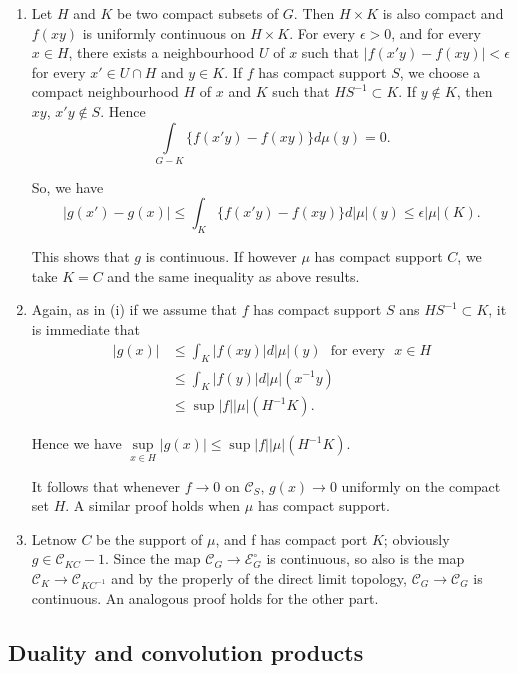 \begin{enumerate}
\renewcommand{\labelenumi}{\roman{enumi}}
\renewcommand{\labelenumi}{(\theenumi)}
\item Let  $H$ and $K$  be two compact subsets of $G$. Then $H \times
  K$ is also compact and $f(xy)$ is uniformly continuous on $H\times
  K$. For every $\epsilon >0$, and for every $x  \in H$, there exists a
  neighbourhood $U$ of $x$  such that $|f(x'y) -f (xy)| < \epsilon$ for
  every $x' \in U \cap H$ and   $y \in   K$. If $f$ has compact support
  $S$, we choose a compact neighbourhood $H$ of $x$ and $K$ such that
  $H S^{-1}\subset K$. If $y \notin K$, then $xy$, $x'y\notin S$. Hence 
$$
\int\limits_{G-K}\bigg\{f(x'y)-f(xy)\bigg\}d\mu (y)=0.
$$

So, we have
$$
|g(x') -g(x)|\leq\int_K \bigg\{f(x'y)-f(xy)\bigg\}d |\mu| (y)
\leqslant \epsilon |\mu|(K).  
$$

This shows that $g$ is continuous. If however $\mu$ has compact
support $C$, we take $K=C$ and the same inequality as above results. 

\item Again, as in (i) if we assume that  $f$ has compact support $S$
  ans $ H S^{-1}\subset K$, it is immediate that 
\begin{align*}
|g(x)| &\leq \int_K | f (xy)| d | \mu| (y) \text{~ for every~ } x \in H\\
&\leq \int_K |f(y) | d|\mu|(x^{-1}y)\\
&\leq \sup |f| |\mu| (H^{-1}K).
\end{align*}

Hence we have $\sup\limits_{x \in H} |g(x)|  \leq \sup  |f||\mu|
(H^{-1}K)$. 

It follows that whenever $f  \rightarrow 0$ on $\mathscr{C} _S$,
$g(x)\rightarrow 0$  uniformly on the compact set $H$. A similar proof
holds when $\mu $ has compact support. 

\item Let\pageoriginale now $C$ be the support of $\mu$, and f has
  compact port $K$; 
  obviously $g \in \mathscr{C}_{KC}-1$. Since the map $\mathscr{C}_G
  \rightarrow \mathscr{E}_G^\circ$ is continuous, so also is the map
  $\mathscr{C}_K \rightarrow \mathscr{C}_{KC^{-1}}$ and by the properly
  of the direct limit topology,
  $\mathscr{C}_G\rightarrow\mathscr{C}_G$ is continuous. An analogous
  proof holds for the other part. 
\end{enumerate}

\subsection{Duality and convolution
  products}\label{partII-chap2-sec2.4}%

